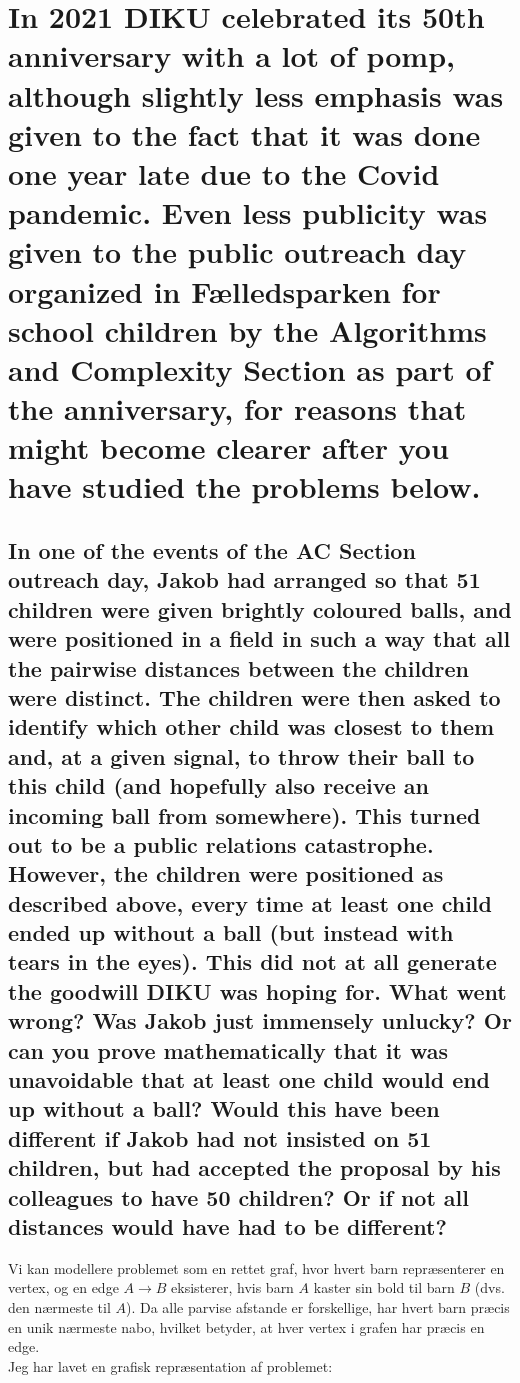 \documentclass[a4paper,12pt]{article}
\begin{document}
\section[Question 2]{In 2021 DIKU celebrated its 50th anniversary with a lot of pomp, although slightly less emphasis was given to the fact that it was done one year late due to the Covid pandemic. Even less publicity was given to the public outreach day organized in F\ae lledsparken for school children by the Algorithms and Complexity Section as part of the anniversary, for reasons that might become clearer after you have studied the problems below.}

\subsection[]{In one of the events of the AC Section outreach day, Jakob had arranged so that 51 children were given brightly coloured balls, and were positioned in a field in such a way that all the pairwise distances between the children were distinct. The children were then asked to identify which other child was closest to them and, at a given signal, to throw their ball to this child (and hopefully also receive an incoming ball from somewhere). This turned out to be a public relations catastrophe. However, the children were positioned as described above, every time at least one child ended up without a ball (but instead with tears in the eyes). This did not at all generate the goodwill DIKU was hoping for. What went wrong? Was Jakob just immensely unlucky? Or can you prove mathematically that it was unavoidable that at least one child would end up without a ball? Would this have been different if Jakob had not insisted on 51 children, but had accepted the proposal by his colleagues to have 50 children? Or if not all distances would have had to be different?}

Vi kan modellere problemet som en rettet graf, hvor hvert barn repræsenterer en vertex, og en edge \( A \to B \) eksisterer, hvis barn \( A \) kaster sin bold til barn \( B \) (dvs. den nærmeste til \( A \)). Da alle parvise afstande er forskellige, har hvert barn præcis en unik nærmeste nabo, hvilket betyder, at hver vertex i grafen har præcis en edge.\\
Jeg har lavet en grafisk repræsentation af problemet:
\end{document}
